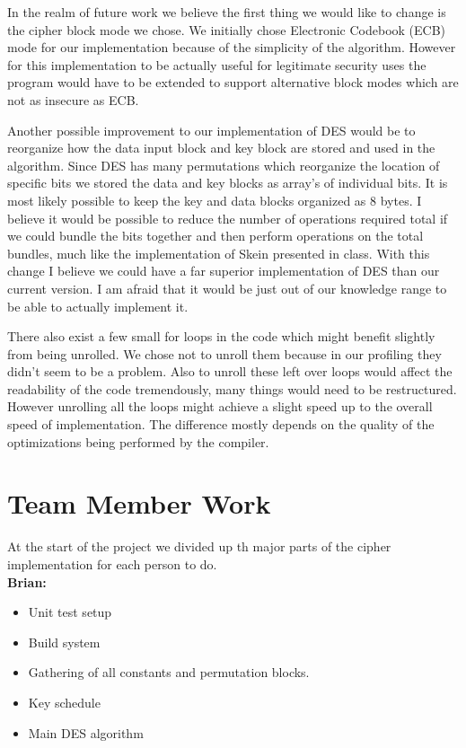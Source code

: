\documentclass[10pt]{article}
\begin{document}
  In the realm of future work we believe the first thing we would like to change is the cipher block mode we chose.
  We initially chose Electronic Codebook (ECB) mode for our implementation because of the simplicity of the algorithm.
  However for this implementation to be actually useful for legitimate security uses the program would have to be extended
  to support alternative block modes which are not as insecure as ECB.

  Another possible improvement to our implementation of DES would be to reorganize how the data input block and key block
  are stored and used in the algorithm. Since DES has many permutations which reorganize the location of specific bits we 
  stored the data and key blocks as array's of individual bits. It is most likely possible to keep the key and data blocks
  organized as 8 bytes. I believe it would be possible to reduce the number of operations required total if we could bundle the 
  bits together and then perform operations on the total bundles, much like the implementation of Skein presented in class. 
  With this change I believe we could have a far superior implementation of DES than our current version. I am afraid that it
  would be just out of our knowledge range to be able to actually implement it. 

  There also exist a few small for loops in the code which might benefit slightly from being unrolled.
  We chose not to unroll them because in our profiling they didn't seem to be a problem. Also to unroll
  these left over loops would affect the readability of the code tremendously, many things would need to be 
  restructured. However unrolling all the loops might achieve a slight speed up to the overall speed of implementation.
  The difference mostly depends on the quality of the optimizations being performed by the compiler.

\section{Team Member Work}

  At the start of the project we divided up th major parts of the cipher implementation for each person to do. \\


  \textbf{Brian:}
  \begin{itemize}
    \item Unit test setup
    \item Build system
    \item Gathering of all constants and permutation blocks.
    \item Key schedule
    \item Main DES algorithm
  \end{itemize}
\end{document}
